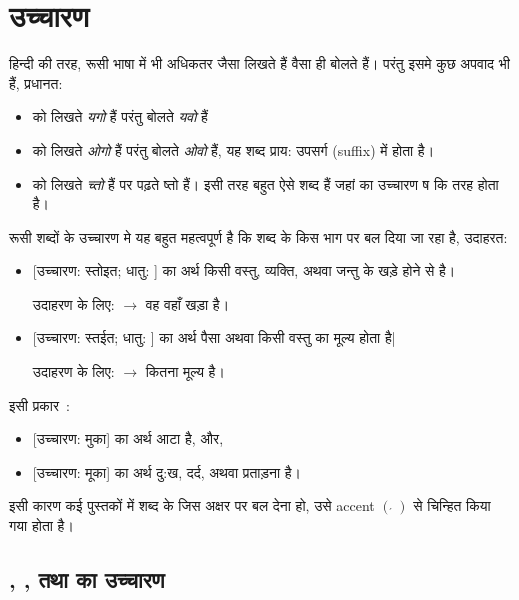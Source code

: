 \section{उच्चारण}\label{sec:intro-pronounce}
हिन्दी की तरह, रूसी भाषा में भी अधिकतर जैसा लिखते हैं वैसा ही बोलते हैं। परंतु इसमे कुछ अपवाद भी हैं, प्रधानत:
\begin{itemize}
    \item {} को लिखते \textit{यगो} हैं परंतु बोलते \textit{यवो} हैं
    \item {} को लिखते \textit{ओगो} हैं परंतु बोलते \textit{ओवो} हैं, यह शब्द प्राय: उपसर्ग (suffix) में होता है।
    \item {} को लिखते \textit{च्तो} हैं पर पढ़ते ष्तो हैं। इसी तरह बहुत ऐसे शब्द हैं जहां  का उच्चारण ष कि तरह होता है।
\end{itemize}

रूसी शब्दों के उच्चारण मे यह बहुत महत्वपूर्ण है कि शब्द के किस भाग पर बल दिया जा रहा है, उदाहरत:
\begin{itemize}
    \item {} [उच्चारण: स्तोइत; धातु: ] का अर्थ किसी वस्तु, व्यक्ति, अथवा जन्तु के खड़े होने से
    है। \par उदाहरण के लिए:  $\rightarrow$ वह वहाँ खड़ा है।
    \item {} [उच्चारण: स्तईत; धातु: ] का अर्थ पैसा अथवा किसी वस्तु का मूल्य होता है| \par उदाहरण के लिए:  $\rightarrow$ कितना मूल्य है।
\end{itemize}

इसी प्रकार~\cite{levine2009}:
\begin{itemize}
    \item {} [उच्चारण: मुका] का अर्थ आटा है, और,
    \item {} [उच्चारण: मूका] का अर्थ दु:ख, दर्द, अथवा प्रताड़ना है।
\end{itemize}

इसी कारण कई पुस्तकों में शब्द के जिस अक्षर पर बल देना हो, उसे accent {\color{blue} {\large $\left( \acute{\,}\, \right)$}} से चिन्हित किया गया होता है। %

\subsection{, , तथा  का उच्चारण}\label{subsec:alpha-pronounce-special-char}

